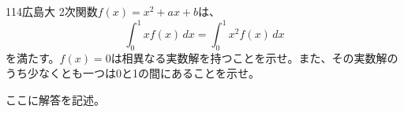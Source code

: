 \begin{thm}{114}{}{広島大}
 2次関数$f(x)=x^2+ax+b$は、
 \[ \int_0^1\! xf(x) \,dx = \int_0^1\! x^2f(x) \,dx \]
 を満たす。$f(x)=0$は相異なる実数解を持つことを示せ。また、その実数解のうち少なくとも一つは0と1の間にあることを示せ。
\end{thm}

ここに解答を記述。